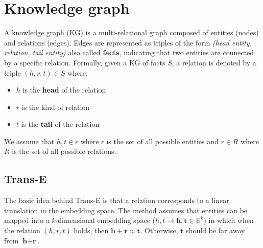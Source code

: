 \section{Knowledge graph}
A knowledge graph (KG) is a multi-relational graph composed of entities (nodes) and relations (edges). Edges are represented as triples of the form \textit{(head entity, relation, tail entity)} also called \textbf{facts}, indicating that two entities are connected by a specific relation.\newline\newline
Formally, given a KG of facts $S$, a relation is denoted by a triple $(h, r, t) \in S$ where:
\begin{itemize}
    \item $h$ is the \textbf{head} of the relation
    \item $r$ is the kind of relation
    \item $t$ is the \textbf{tail} of the relation
\end{itemize}
We assume that $h, t \in \epsilon$ where $\epsilon$ is the set of all possible entities and $r \in R$ where $R$ is the set of all possible relations. 

\subsection{Trans-E}
The basic idea behind Trans-E is that a relation corresponds to a linear translation in the embedding space. The method assumes that entities can be mapped into a $k$-dimensional embedding space ($h,t \rightarrow \textbf{h},\textbf{t} \in \mathbb{R}^{k}$) in which when the relation $(h, r, t)$ holds, then $\textbf{h} + \textbf{r} \approx \textbf{t}$. Otherwise, $\textbf{t}$ should be far away from $\textbf{h} + \textbf{r}$.

